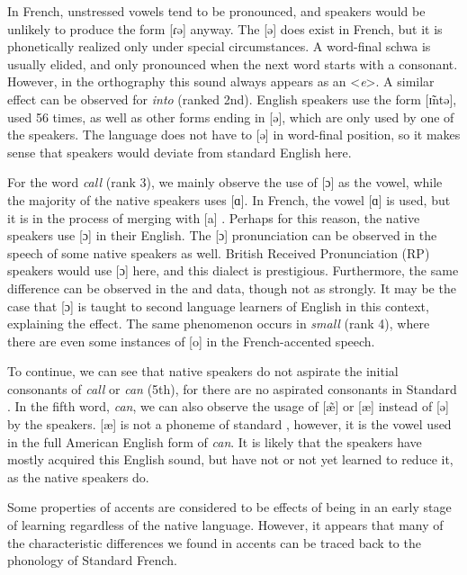 \documentclass[output=paper]{LSP/langsci}
\begin{document}
In French, unstressed vowels tend to be pronounced, and  speakers would be unlikely to produce the form [ɾə] anyway. The [ə] does exist in French, but it is phonetically realized only under special circumstances. A word-final schwa is usually elided, and only pronounced when the next word starts with a consonant. However, in the orthography this sound always appears as an <\textit{e}>. A similar effect can be observed for \textit{into} (ranked 2nd). English speakers use the form [ɪ̃ntə], used 56 times, as well as other forms ending in [ə], which are only used by one of the  speakers. The  language does not have  to [ə] in word-final position, so it makes sense that  speakers would deviate from standard English here.

\largerpage[-1]
For the word \textit{call} (rank 3), we mainly observe the use of [ɔ] as the vowel, while the majority of the native speakers uses [ɑ]. In French, the vowel [ɑ] is used, but it is in the process of merging with [a] \citep[60--62]{walker_french_2001}. Perhaps for this reason, the  native speakers use [ɔ] in their English. The [ɔ] pronunciation can be observed in the speech of some native speakers as well. British Received Pronunciation (RP) speakers would use [ɔ] here, and this dialect is prestigious. Furthermore, the same difference can be observed in the  and  data, though not as strongly. It may be the case that [ɔ] is taught to second language learners of English in this context, explaining the effect. The same phenomenon occurs in \textit{small} (rank 4), where there are even some instances of [o] in the French-accented speech.

To continue, we can see that  native speakers do not aspirate the initial consonants of \textit{call} or \textit{can} (5th), for there are no aspirated consonants in Standard  \citep[p. 35]{walker_pronunciation_1984}. In the fifth word, \textit{can}, we can also observe the usage of [æ̃] or [æ] instead of [ə] by the  speakers. [æ] is not a phoneme of standard  \citep{walker_french_2001}, however, it is the vowel used in the full American English form of \textit{can}. It is likely that the speakers have mostly acquired this English sound, but have not or not yet learned to reduce it, as the native speakers do.

Some properties of accents are considered to be effects of being in an early stage of learning regardless of the native language. However, it appears that many of the characteristic differences we found in  accents can be traced back to the phonology of Standard French.
\end{document}
